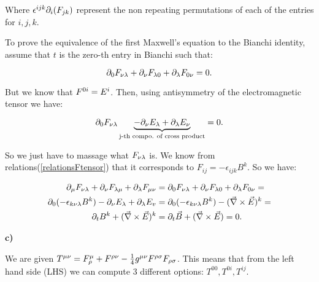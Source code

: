 Where $\epsilon^{ijk} \partial_{i}(F_{jk })$ represent the non repeating permutations of each of the entries for $i,j,k$.

To prove the equivalence of the first Maxwell's equation to the Bianchi identity, assume that $t$ is the zero-th entry in Bianchi such that:

\begin{equation}
	\partial_{0} F_{\nu\lambda } + \partial_{\nu} F_{\lambda0 }+ \partial_{\lambda} F_{0\nu }=0.
\end{equation}

But we know that $F^{0i } = E^{i}$. Then, using antisymmetry of the electromagnetic tensor we have:

\begin{equation}
	\partial_{0} F_{\nu\lambda } \underbrace{-\partial_{\nu} E_{\lambda}+ \partial_{\lambda} E_{\nu}}_{\text{j-th compo. of cross product}}=0.
\end{equation}

So we just have to massage what $F_{\nu\lambda }$ is. We know from relations(\ref{relationsFtensor}) that it corresponds to $F_{ij} = -\epsilon_{ijk}B^{k}$. So we have:

\begin{equation}
	\begin{split}
		\partial_{\mu} F_{\nu\lambda } + \partial_{\nu} F_{\lambda\mu }+ \partial_{\lambda} F_{\mu\nu }&=	\partial_{0} F_{\nu\lambda } + \partial_{\nu} F_{\lambda0 }+ \partial_{\lambda} F_{0\nu }=\\
		\partial_{0}(-\epsilon_{k\nu\lambda}B^{k}) - \partial_{\nu} E_{\lambda}+ \partial_{\lambda} E_{v}&=\partial_{0}(-\epsilon_{k\nu\lambda}B^{k}) - (\vec{\nabla}\times \vec{E})^{k}=\\
		\partial_{t}B^{k} + (\vec{\nabla}\times \vec{E})^{k} &= \partial_{t}\vec{B}+ (\vec{\nabla}\times \vec{E})=0.
	\end{split}
\end{equation}

\textbf{c)}

We are given $T^{\mu\nu} = F^{\mu}_{\rho} + F^{\rho\nu } - \frac{1}{4} g^{\mu\nu}F^{\rho\sigma }F_{\rho\sigma }$. This means that from the left hand side (LHS) we can compute 3 different options: $T^{00},T^{0i},T^{ij}$. 

